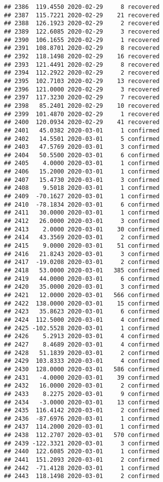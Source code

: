 \documentclass[
]{article}
\begin{document}
\begin{verbatim}
## 2386  119.4550 2020-02-29     8 recovered
## 2387  115.7221 2020-02-29    21 recovered
## 2388  126.1923 2020-02-29     2 recovered
## 2389  122.6085 2020-02-29     3 recovered
## 2390  106.1655 2020-02-29     1 recovered
## 2391  108.8701 2020-02-29     8 recovered
## 2392  118.1498 2020-02-29    16 recovered
## 2393  121.4491 2020-02-29     8 recovered
## 2394  112.2922 2020-02-29     2 recovered
## 2395  102.7103 2020-02-29    13 recovered
## 2396  121.0000 2020-02-29     3 recovered
## 2397  117.3230 2020-02-29     7 recovered
## 2398   85.2401 2020-02-29    10 recovered
## 2399  101.4870 2020-02-29     1 recovered
## 2400  120.0934 2020-02-29    41 recovered
## 2401   45.0382 2020-03-01     1 confirmed
## 2402   14.5501 2020-03-01     5 confirmed
## 2403   47.5769 2020-03-01     3 confirmed
## 2404   50.5500 2020-03-01     6 confirmed
## 2405    4.0000 2020-03-01     1 confirmed
## 2406   15.2000 2020-03-01     1 confirmed
## 2407   15.4730 2020-03-01     3 confirmed
## 2408    9.5018 2020-03-01     1 confirmed
## 2409  -70.1627 2020-03-01     1 confirmed
## 2410  -78.1834 2020-03-01     6 confirmed
## 2411   30.0000 2020-03-01     1 confirmed
## 2412   26.0000 2020-03-01     3 confirmed
## 2413    2.0000 2020-03-01    30 confirmed
## 2414   43.3569 2020-03-01     2 confirmed
## 2415    9.0000 2020-03-01    51 confirmed
## 2416   21.8243 2020-03-01     3 confirmed
## 2417  -19.0208 2020-03-01     2 confirmed
## 2418   53.0000 2020-03-01   385 confirmed
## 2419   44.0000 2020-03-01     6 confirmed
## 2420   35.0000 2020-03-01     3 confirmed
## 2421   12.0000 2020-03-01   566 confirmed
## 2422  138.0000 2020-03-01    15 confirmed
## 2423   35.8623 2020-03-01     6 confirmed
## 2424  112.5000 2020-03-01     4 confirmed
## 2425 -102.5528 2020-03-01     1 confirmed
## 2426    5.2913 2020-03-01     4 confirmed
## 2427    8.4689 2020-03-01     4 confirmed
## 2428   51.1839 2020-03-01     2 confirmed
## 2429  103.8333 2020-03-01     4 confirmed
## 2430  128.0000 2020-03-01   586 confirmed
## 2431   -4.0000 2020-03-01    39 confirmed
## 2432   16.0000 2020-03-01     2 confirmed
## 2433    8.2275 2020-03-01     9 confirmed
## 2434   -3.0000 2020-03-01    13 confirmed
## 2435  116.4142 2020-03-01     2 confirmed
## 2436  -87.6976 2020-03-01     1 confirmed
## 2437  114.2000 2020-03-01     1 confirmed
## 2438  112.2707 2020-03-01   570 confirmed
## 2439 -122.3321 2020-03-01     3 confirmed
## 2440  122.6085 2020-03-01     1 confirmed
## 2441  151.2093 2020-03-01     2 confirmed
## 2442  -71.4128 2020-03-01     1 confirmed
## 2443  118.1498 2020-03-01     2 confirmed

\end{verbatim}
\end{document}
